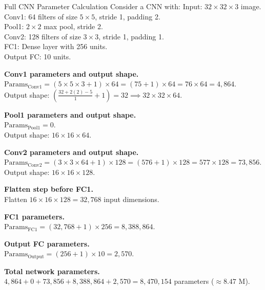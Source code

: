\documentclass[a4paper,11pt]{article}
\begin{document}
\begin{worked}{Full CNN Parameter Calculation}
Consider a CNN with:
Input: $32 \times 32 \times 3$ image. \\
Conv1: 64 filters of size $5 \times 5$, stride 1, padding 2. \\
Pool1: $2 \times 2$ max pool, stride 2. \\
Conv2: 128 filters of size $3 \times 3$, stride 1, padding 1. \\
FC1: Dense layer with 256 units. \\
Output FC: 10 units.
\begin{steps}
  \item \textbf{Conv1 parameters and output shape.} \\
        $\text{Params}_{\text{Conv1}} = (5 \times 5 \times 3 + 1) \times 64 = (75 + 1) \times 64 = 76 \times 64 = 4,864$. \\
        Output shape: $\left(\frac{32 + 2(2) - 5}{1} + 1\right) = 32 \implies 32 \times 32 \times 64$.
  \item \textbf{Pool1 parameters and output shape.} \\
        $\text{Params}_{\text{Pool1}} = 0$. \\
        Output shape: $16 \times 16 \times 64$.
  \item \textbf{Conv2 parameters and output shape.} \\
        $\text{Params}_{\text{Conv2}} = (3 \times 3 \times 64 + 1) \times 128 = (576 + 1) \times 128 = 577 \times 128 = 73,856$. \\
        Output shape: $16 \times 16 \times 128$.
  \item \textbf{Flatten step before FC1.} \\
        Flatten $16 \times 16 \times 128 = 32,768$ input dimensions.
  \item \textbf{FC1 parameters.} \\
        $\text{Params}_{\text{FC1}} = (32,768 + 1) \times 256 = 8,388,864$.
  \item \textbf{Output FC parameters.} \\
        $\text{Params}_{\text{Output}} = (256 + 1) \times 10 = 2,570$.
  \item \textbf{Total network parameters.} \\
        $4,864 + 0 + 73,856 + 8,388,864 + 2,570 = 8,470,154$ parameters ($\approx 8.47 \text{ M}$).
\end{steps}
\end{worked}
\end{document}
